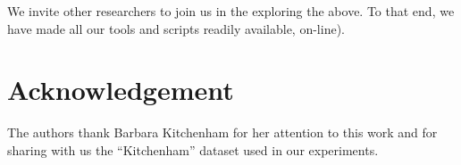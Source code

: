 \documentclass{svjour3}
\theoremstyle{break}
\begin{document}
 We invite other researchers to join us in the exploring the above. To that end, we have made all our tools and scripts readily available, on-line).


\section*{Acknowledgement}
The authors thank Barbara Kitchenham for
her attention to this work and for
sharing with us the ``Kitchenham'' dataset used in our experiments.
 
% 

%  

\end{document}
